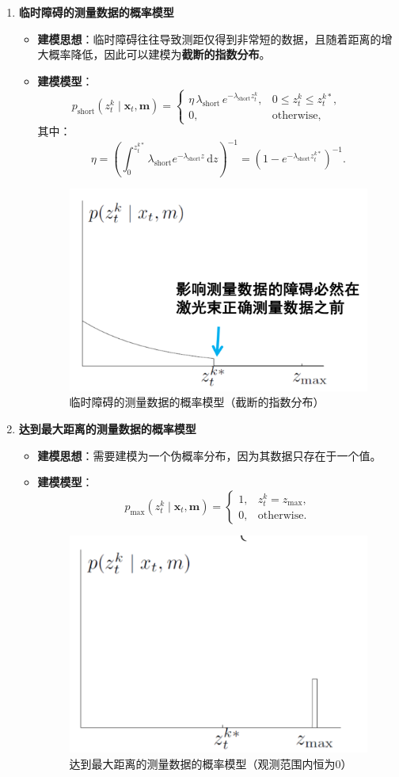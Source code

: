 \documentclass[../main.tex]{subfiles}
\begin{document}
\begin{enumerate}
\begin{enumerate}
    \item \textbf{临时障碍的测量数据的概率模型}
    \begin{itemize}
        \item \textbf{建模思想}：临时障碍往往导致测距仅得到非常短的数据，且随着距离的增大概率降低，因此可以建模为\textbf{截断的指数分布}。
        \item \textbf{建模模型}：
        \[
        p_{\mathrm{short}}\!\left(z_t^{k}\mid \mathbf{x}_t,\mathbf{m}\right)=
        \begin{cases}
            \eta\,\lambda_{\mathrm{short}}\,e^{-\lambda_{\mathrm{short}} z_t^{k}}, & 0\le z_t^{k}\le z_{t}^{k*},\\[2pt]
            0, & \text{otherwise},
        \end{cases}
        \qquad
        \]
        其中：
        \[
        \eta=\left(\displaystyle\int_{0}^{z_{t}^{k*}}\lambda_{\mathrm{short}} e^{-\lambda_{\mathrm{short}} z}\,\mathrm{d}z\right)^{-1}
        =(1-e^{-\lambda_{\mathrm{short}} z_{t}^{k*}})^{-1}.
        \]
        \begin{figure}[H]
            \centering
            \includegraphics[width=0.35\linewidth]{images/guance2.png}
            \caption{临时障碍的测量数据的概率模型（截断的指数分布）}
        \end{figure}
    \end{itemize}

    \item \textbf{达到最大距离的测量数据的概率模型}
    \begin{itemize}
        \item \textbf{建模思想}：需要建模为一个伪概率分布，因为其数据只存在于一个值。
        \item \textbf{建模模型}：
        \[
        p_{\mathrm{max}}\!\left(z_t^{k}\mid \mathbf{x}_t,\mathbf{m}\right)=
        \begin{cases}
            1, & z_t^{k}=z_{\max},\\
            0, & \text{otherwise}.
        \end{cases}
        \]
        \begin{figure}[H]
            \centering
            \includegraphics[width=0.35\linewidth]{images/guance3.png}
            \caption{达到最大距离的测量数据的概率模型（观测范围内恒为0）}
        \end{figure}
    \end{itemize}


\end{enumerate}
\end{enumerate}
\end{document}
